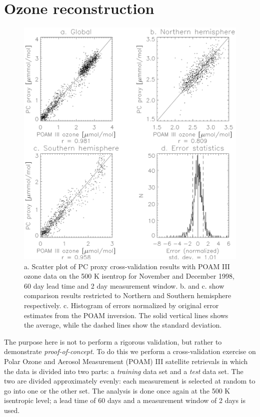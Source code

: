 \section{Ozone reconstruction}

\begin{figure}
\begin{center}
\includegraphics[width=1\textwidth]{POAM_proxyscat.eps}
\caption{a. Scatter plot of PC proxy cross-validation results
with POAM III ozone data on the 500 K isentrop for November
and December 1998, 60 day lead time and 2 day measurement window.
b. and c. show comparison results restricted to Northern and Southern hemisphere
respectively.  c. Histogram of errors normalized by original error
estimates from the POAM inversion.
The solid vertical lines shows the average, while the dashed lines show the standard
deviation.}\label{POAM_proxyscat}
\end{center}
\end{figure}

The purpose here is not to perform a rigorous validation, but rather
to demonstrate \textit{proof-of-concept}.
To do this we perform a cross-validation exercise on Polar Ozone
and Aerosol Measurement (POAM) III satellite retrievals \citep{Lucke_etal1999}
in which the data is
divided into two parts: a \textit{training} data set and 
a \textit{test} data set.  The two are divided approximately evenly:
each measurement is selected at random to go into one or the other set.
The analysis is done once again at the 500 K isentropic level; 
a lead time of 60 days and a measurement window of 2 days is used.

